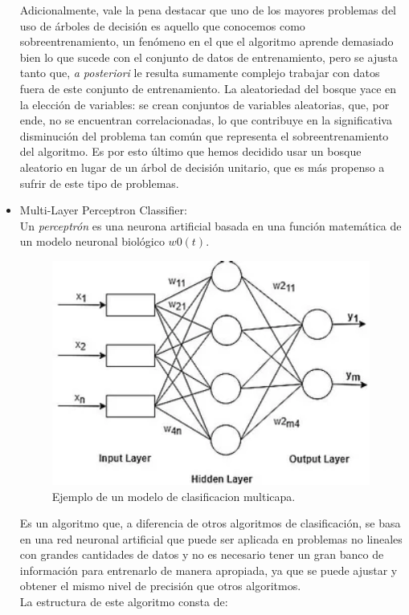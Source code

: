 \documentclass[runningheads]{llncs}
\begin{document}
\begin{itemize}
    \newline Adicionalmente, vale la pena destacar que uno de los mayores problemas del uso de árboles de decisión es aquello que conocemos como sobreentrenamiento, un fenómeno en el que el algoritmo aprende demasiado bien lo que sucede con el conjunto de datos de entrenamiento, pero se ajusta tanto que, \textit{a posteriori} le resulta sumamente complejo trabajar con datos fuera de este conjunto de entrenamiento. La aleatoriedad del bosque yace en la elección de variables: se crean conjuntos de variables aleatorias, que, por ende, no se encuentran correlacionadas, lo que contribuye en la significativa disminución del problema tan común que representa el sobreentrenamiento del algoritmo. Es por esto último que hemos decidido usar un bosque aleatorio en lugar de un árbol de decisión unitario, que es más propenso a sufrir de este tipo de problemas.
    
    \newpage
    
    \item Multi-Layer Perceptron Classifier:\\
    Un \textit{perceptrón} es una neurona artificial basada en una función matemática de un modelo neuronal biológico $w0(t)$.  
    
    \begin{figure}
        \centering
        \includegraphics[width=0.8\columnwidth]{classifier1.png}
        \caption{Ejemplo de un modelo de clasificacion multicapa.}
        \label{fig:comand}%
    \end{figure}
    
    Es un algoritmo que, a diferencia de otros algoritmos de clasificación, se basa en una red neuronal artificial que puede ser aplicada en problemas no lineales con grandes cantidades de datos y no es necesario tener un gran banco de información para entrenarlo de manera apropiada, ya que se puede ajustar y obtener el mismo nivel de precisión que otros algoritmos.\\
    La estructura de este algoritmo consta de:
    

\end{itemize}
\end{document}
